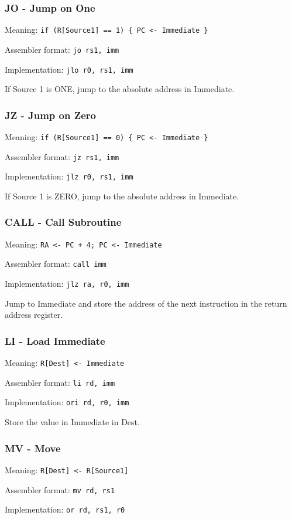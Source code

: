 \documentclass{article}
\begin{document}
\subsubsection{JO - Jump on One}
Meaning: \verb|if (R[Source1] == 1) { PC <- Immediate }|

Assembler format: \verb|jo rs1, imm|

Implementation: \verb|jlo r0, rs1, imm|

If Source 1 is ONE, jump to the absolute address in Immediate.

\subsubsection{JZ - Jump on Zero}
Meaning: \verb|if (R[Source1] == 0) { PC <- Immediate }|

Assembler format: \verb|jz rs1, imm|

Implementation: \verb|jlz r0, rs1, imm|

If Source 1 is ZERO, jump to the absolute address in Immediate.

\subsubsection{CALL - Call Subroutine}
Meaning: \verb|RA <- PC + 4; PC <- Immediate|

Assembler format: \verb|call imm|

Implementation: \verb|jlz ra, r0, imm|

Jump to Immediate and store the address of the next instruction in the return address register.

\subsubsection{LI - Load Immediate}
Meaning: \verb|R[Dest] <- Immediate|

Assembler format: \verb|li rd, imm|

Implementation: \verb|ori rd, r0, imm|

Store the value in Immediate in Dest.

\subsubsection{MV - Move}
Meaning: \verb|R[Dest] <- R[Source1]|

Assembler format: \verb|mv rd, rs1|

Implementation: \verb|or rd, rs1, r0|
\end{document}
